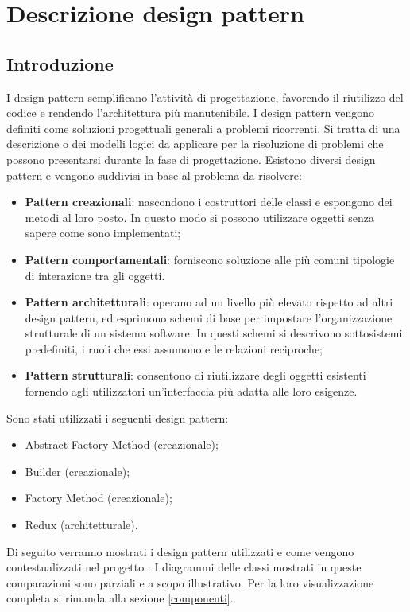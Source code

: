 \newpage
\section{Descrizione design pattern}
\subsection{Introduzione}
I design pattern semplificano l'attività di progettazione, favorendo il riutilizzo del codice e rendendo l'architettura più manutenibile. I design pattern vengono definiti come soluzioni progettuali generali a problemi ricorrenti. Si tratta di una descrizione o dei modelli logici da applicare per la risoluzione di problemi che possono presentarsi durante la fase di progettazione. Esistono diversi design pattern e vengono suddivisi in base al problema da risolvere:
\begin{itemize}
	\item \textbf{Pattern creazionali}: nascondono i costruttori delle classi e espongono dei metodi al loro posto. In questo modo si possono utilizzare oggetti senza sapere come sono implementati;
	\item \textbf{Pattern comportamentali}: forniscono soluzione alle più comuni tipologie di interazione tra gli oggetti.
	\item \textbf{Pattern architetturali}: operano ad un livello più elevato rispetto ad altri design pattern, ed esprimono schemi di base per impostare l'organizzazione strutturale di un sistema software. In questi schemi si descrivono sottosistemi predefiniti, i ruoli che essi assumono e le relazioni reciproche;
	\item \textbf{Pattern strutturali}: consentono di riutilizzare degli oggetti esistenti fornendo agli utilizzatori un'interfaccia più adatta alle loro esigenze.
\end{itemize}
Sono stati utilizzati i seguenti design pattern:
\begin{itemize}
	\item Abstract Factory Method (creazionale);
	\item Builder (creazionale);
	\item Factory Method (creazionale);
	\item Redux (architetturale).
\end{itemize}

Di seguito verranno mostrati i design pattern utilizzati e come vengono contestualizzati nel progetto \progetto{}. I diagrammi delle classi mostrati in queste comparazioni sono parziali e a scopo illustrativo. Per la loro visualizzazione completa si rimanda alla sezione \ref{componenti}.

